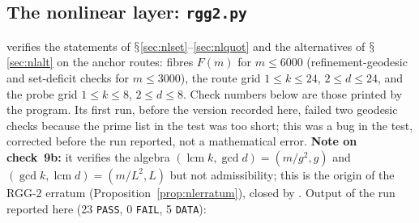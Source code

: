 \documentclass[11pt,a4paper]{article}
\renewcommand{\S}{\ensuremath{\mathsection}}
\newcommand{\lcm}{\operatorname{lcm}}
\theoremstyle{plain}
\theoremstyle{definition}
\begin{document}
\subsection{The nonlinear layer: \texttt{rgg2.py}}\label{sec:rgg2}
 verifies the statements of \S\ref{sec:nlset}--\ref{sec:nlquot} and the alternatives of \S\ref{sec:nlalt} on the anchor routes: fibres $F(m)$ for $m\le6000$ (refinement-geodesic and set-deficit checks for $m\le3000$), the route grid $1\le k\le24$, $2\le d\le24$, and the probe grid $1\le k\le8$, $2\le d\le8$. Check numbers below are those printed by the program. Its first run, before the version recorded here, failed two geodesic checks because the prime list in the test was too short; this was a bug in the test, corrected before the run reported, not a mathematical error. \textbf{Note on check~9b:} it verifies the algebra $(\lcm k,\gcd d)=(m/g^2,g)$ and $(\gcd k,\lcm d)=(m/L^2,L)$ but not admissibility; this is the origin of the RGG-2 erratum (Proposition~\ref{prop:nlerratum}), closed by .
Output of the run reported here (23 \texttt{PASS}, 0 \texttt{FAIL}, 5 \texttt{DATA}):
\end{document}
